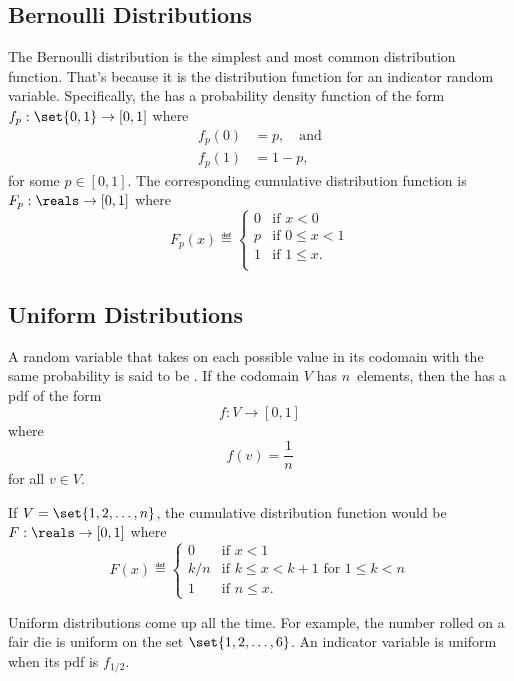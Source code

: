 \subsection{Bernoulli Distributions}\label{sec:bernoulli_dist}

The Bernoulli distribution is the simplest and most common
distribution function.  That's because it is the distribution function
for an indicator random variable.  Specifically, the  has a probability density function of the form $f_p:
\set{0, 1} \to [0, 1]$ where
\begin{align*}
    f_p(0) &= p, \quad\text{and} \\
    f_p(1) &= 1 - p,
\end{align*}
for some $p \in [0, 1]$.  The corresponding cumulative distribution
function is $F_p: \reals \to [0, 1]$ where
\begin{equation*}
F_{p}(x) \eqdef
    \begin{cases}
        0 & \text{if $x < 0$} \\
        p & \text{if $0 \le x < 1$} \\
        1 & \text{if $1 \le x$}. \\
    \end{cases}
\end{equation*}

\subsection{Uniform Distributions}\label{sec:uniform_dist}

A random variable that takes on each possible value in its codomain
with the same probability is said to be .  If the
codomain $V$ has $n$~elements, then the  has a pdf of the form
\begin{equation*}
    f: V \to [0,1]
\end{equation*}
where
\[
    f(v) = \frac{1}{n}
\]
for all $v \in V$.  

If $V = \set{1,2,\dots,n}$, the cumulative distribution function would be
$F: \reals \to [0, 1]$ where
\[
F(x) \eqdef
    \begin{cases}
        0 & \text{if $x < 1$} \\
        k/n & \text{if $k \le x < k + 1$ for $1 \le k < n$} \\
        1 & \text{if $n \le x$}.
    \end{cases}
\]

Uniform distributions come up all the time.  For example, the number
rolled on a fair die is uniform on the set $\set{1, 2, \dots, 6}$.  An
indicator variable is uniform when its pdf is $f_{1/2}$.

